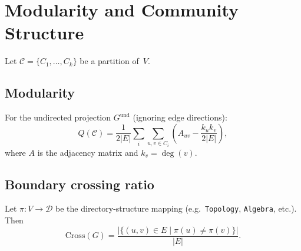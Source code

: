 \section{Modularity and Community Structure}

Let $\mathcal{C} = \{C_1, \ldots, C_k\}$ be a partition of~$V$.

\subsection{Modularity}

\begin{definition}[Modularity]
For the undirected projection $G^{\mathrm{und}}$ (ignoring edge directions):
\[
  Q(\mathcal{C}) = \frac{1}{2|E|} \sum_{i} \sum_{u,v \in C_i}
    \left( A_{uv} - \frac{k_u k_v}{2|E|} \right),
\]
where $A$ is the adjacency matrix and $k_v = \deg(v)$.
\end{definition}

\subsection{Boundary crossing ratio}

\begin{definition}
Let $\pi \colon V \to \mathcal{D}$ be the directory-structure mapping
(e.g.\ \texttt{Topology}, \texttt{Algebra}, etc.). Then
\[
  \mathrm{Cross}(G) = \frac{|\{(u,v) \in E \mid \pi(u) \neq \pi(v)\}|}{|E|}.
\]
\end{definition}
